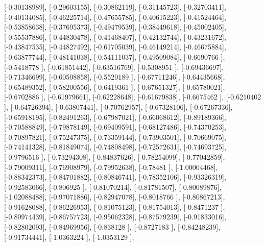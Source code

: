 \documentclass{article}
\begin{document}
       [-0.30138989],
       [-0.29603155],
       [-0.30862119],
       [-0.31145723],
       [-0.32703411],
       [-0.40134085],
       [-0.46225714],
       [-0.47655785],
       [-0.40615223],
       [-0.41524464],
       [-0.53858638],
       [-0.37695373],
       [-0.49479539],
       [-0.38449618],
       [-0.45002405],
       [-0.55537886],
       [-0.44830478],
       [-0.41468407],
       [-0.42132744],
       [-0.43231672],
       [-0.43847535],
       [-0.44827492],
       [-0.61705039],
       [-0.46149214],
       [-0.46675884],
       [-0.63877744],
       [-0.48141038],
       [-0.54111037],
       [-0.49509084],
       [-0.6690766 ],
       [-0.5418778 ],
       [-0.61851442],
       [-0.63516769],
       [-0.5308951 ],
       [-0.69436697],
       [-0.71346699],
       [-0.60508858],
       [-0.5520189 ],
       [-0.67711246],
       [-0.64435668],
       [-0.65489352],
       [-0.58200556],
       [-0.6419361 ],
       [-0.67651327],
       [-0.65780021],
       [-0.6702886 ],
       [-0.61979661],
       [-0.62228648],
       [-0.61679838],
       [-0.6675462 ],
       [-0.6210402 ],
       [-0.64726394],
       [-0.63807441],
       [-0.70762957],
       [-0.67328106],
       [-0.67267336],
       [-0.65918195],
       [-0.82491263],
       [-0.67987021],
       [-0.66068612],
       [-0.89189366],
       [-0.70588849],
       [-0.79878149],
       [-0.69409591],
       [-0.68127486],
       [-0.74370253],
       [-0.70897821],
       [-0.75247375],
       [-0.73359144],
       [-0.73903501],
       [-0.70669075],
       [-0.74141328],
       [-0.81849074],
       [-0.74808498],
       [-0.72572631],
       [-0.74693725],
       [-0.9796516 ],
       [-0.73294308],
       [-0.84837626],
       [-0.78254099],
       [-0.77042859],
       [-0.79009311],
       [-0.76908979],
       [-0.79952638],
       [-0.78481   ],
       [-1.00004468],
       [-0.88342373],
       [-0.84701882],
       [-0.80846741],
       [-0.78352106],
       [-0.93326319],
       [-0.92583066],
       [-0.806925  ],
       [-0.81070214],
       [-0.81781507],
       [-0.80089876],
       [-1.02088488],
       [-0.97071886],
       [-0.82947078],
       [-0.8018766 ],
       [-0.80867213],
       [-0.91628088],
       [-0.86226953],
       [-0.81075123],
       [-0.81754013],
       [-0.8471237 ],
       [-0.80974439],
       [-0.86757723],
       [-0.95062328],
       [-0.87579239],
       [-0.91833016],
       [-0.82802093],
       [-0.84969956],
       [-0.838128  ],
       [-0.8727183 ],
       [-0.84248239],
       [-0.91734441],
       [-1.0363224 ],
       [-1.0353129 ],
\end{document}
